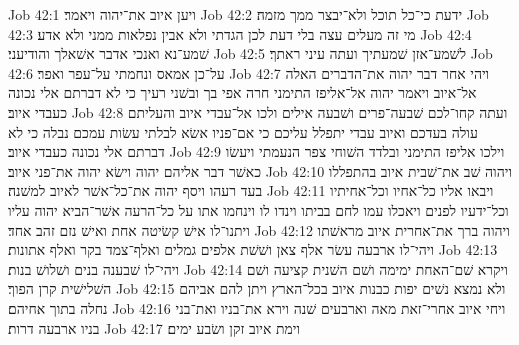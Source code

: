 Job 42:1  ויען איוב את־יהוה ויאמר׃
Job 42:2  ידעת כי־כל תוכל ולא־יבצר ממך מזמה׃
Job 42:3  מי זה מעלים עצה בלי דעת לכן הגדתי ולא אבין נפלאות ממני ולא אדע׃
Job 42:4  שׁמע־נא ואנכי אדבר אשׁאלך והודיעני׃
Job 42:5  לשׁמע־אזן שׁמעתיך ועתה עיני ראתך׃
Job 42:6  על־כן אמאס ונחמתי על־עפר ואפר׃
Job 42:7  ויהי אחר דבר יהוה את־הדברים האלה אל־איוב ויאמר יהוה אל־אליפז התימני חרה אפי בך ובשׁני רעיך כי לא דברתם אלי נכונה כעבדי איוב׃
Job 42:8  ועתה קחו־לכם שׁבעה־פרים ושׁבעה אילים ולכו אל־עבדי איוב והעליתם עולה בעדכם ואיוב עבדי יתפלל עליכם כי אם־פניו אשׂא לבלתי עשׂות עמכם נבלה כי לא דברתם אלי נכונה כעבדי איוב׃
Job 42:9  וילכו אליפז התימני ובלדד השׁוחי צפר הנעמתי ויעשׂו כאשׁר דבר אליהם יהוה וישׂא יהוה את־פני איוב׃
Job 42:10  ויהוה שׁב את־שׁבית איוב בהתפללו בעד רעהו ויסף יהוה את־כל־אשׁר לאיוב למשׁנה׃
Job 42:11  ויבאו אליו כל־אחיו וכל־אחיתיו וכל־ידעיו לפנים ויאכלו עמו לחם בביתו וינדו לו וינחמו אתו על כל־הרעה אשׁר־הביא יהוה עליו ויתנו־לו אישׁ קשׂיטה אחת ואישׁ נזם זהב אחד׃
Job 42:12  ויהוה ברך את־אחרית איוב מראשׁתו ויהי־לו ארבעה עשׂר אלף צאן ושׁשׁת אלפים גמלים ואלף־צמד בקר ואלף אתונות׃
Job 42:13  ויהי־לו שׁבענה בנים ושׁלושׁ בנות׃
Job 42:14  ויקרא שׁם־האחת ימימה ושׁם השׁנית קציעה ושׁם השׁלישׁית קרן הפוך׃
Job 42:15  ולא נמצא נשׁים יפות כבנות איוב בכל־הארץ ויתן להם אביהם נחלה בתוך אחיהם׃
Job 42:16  ויחי איוב אחרי־זאת מאה וארבעים שׁנה וירא את־בניו ואת־בני בניו ארבעה דרות׃
Job 42:17  וימת איוב זקן ושׂבע ימים׃


